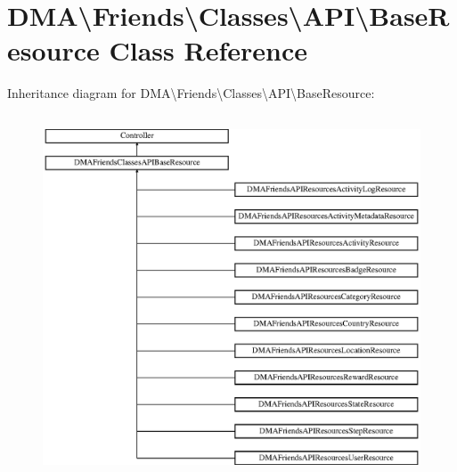 \hypertarget{classDMA_1_1Friends_1_1Classes_1_1API_1_1BaseResource}{}\section{D\+M\+A\textbackslash{}Friends\textbackslash{}Classes\textbackslash{}A\+P\+I\textbackslash{}Base\+Resource Class Reference}
\label{classDMA_1_1Friends_1_1Classes_1_1API_1_1BaseResource}
Inheritance diagram for D\+M\+A\textbackslash{}Friends\textbackslash{}Classes\textbackslash{}A\+P\+I\textbackslash{}Base\+Resource\+:\begin{figure}[H]
\begin{center}
\leavevmode
\includegraphics[height=10.833334cm]{dc/d47/classDMA_1_1Friends_1_1Classes_1_1API_1_1BaseResource}
\end{center}
\end{figure}
